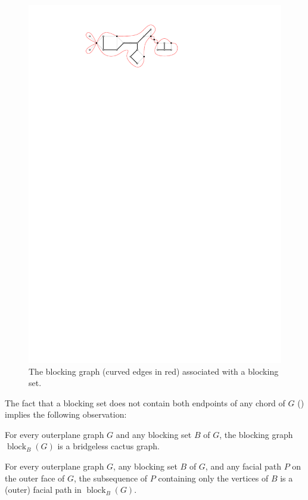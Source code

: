 \documentclass{cccg16}
\DeclareMathOperator{\block}{block}
\begin{document}
\begin{figure}
  \begin{center}
     \includegraphics{figs/blocking-set-2}
  \end{center}
  \caption{The blocking graph (curved edges in red) associated with a
           blocking set.}
\end{figure}

The fact that a blocking set does not contain both endpoints of any
chord of $G$ () implies the following observation:

\begin{obs}
   For every outerplane graph $G$ and any blocking set $B$ of $G$,
   the blocking graph $\block_B(G)$ is a bridgeless cactus graph.
\end{obs}

\begin{obs}
  For every outerplane graph $G$, any blocking set $B$ of $G$, and any
  facial path $P$ on the outer face of  $G$, the subsequence of $P$
  containing only the vertices of $B$ is a (outer) facial path in
  $\block_B(G)$.
\end{obs}
\end{document}
